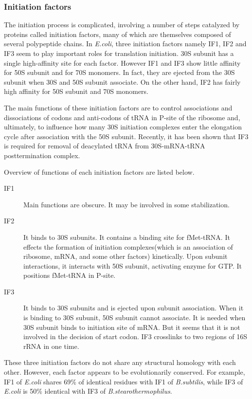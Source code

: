  
\subsubsection{Initiation factors}
The initiation process is complicated, involving a number of steps
catalyzed by proteins called initiation factors, many of which are
themselves composed of several polypeptide chains. In {\it E.coli},
three initiation factors namely IF1, IF2 and IF3 seem to play
important roles for translation initiation. 30S subunit has a single
high-affinity site for each factor.  However IF1 and IF3 show little
affinity for 50S subunit and for 70S monomers.  In fact, they are
ejected from the 30S subunit when 30S and 50S subunit associate. On
the other hand, IF2 has fairly high affinity for 50S subunit and 70S
monomers.

The main functions of these initiation factors are to control associations
and dissociations of codons and anti-codons of tRNA in P-site of the
ribosome and, ultimately, to influence how many 30S initiation 
complexes enter the elongation cycle after association with the 50S subunit.
Recently, it has been shown that IF3 is required for removal of
deacylated tRNA from 30S-mRNA-tRNA posttermination complex\cite{label1189}.

Overview of functions of each initiation factors are listed below.
\begin{description}

\item[IF1] Main functions are obscure. 
It may be involved in some stabilization.

\item[IF2] It binds to 30S subunits. It contains a binding site for fMet-tRNA.
      It effects the formation of initiation complexes(which is an association
of  ribosome, mRNA, and some other factors) kinetically. Upon subunit 
interactions, it interacts with 50S subunit, activating enzyme for GTP.
It positions fMet-tRNA in P-site.

\item[IF3] It binds to 30S subunits and is ejected upon subunit association.
  When it is binding to 30S subunit, 50S subunit cannot associate. It is
  needed when 30S subunit binds to initiation site of mRNA. But it seems that
  it is not involved in the decision of start codon.
  IF3 crosslinks to two regions of 16S rRNA in one time.
\end{description}

These three initiation factors do not share any structural homology
with each other. However, each factor appears to be evolutionarily
conserved. For example, IF1 of {\it E.coli} shares 69\% of identical
residues with IF1 of {\it B.subtilis}, while IF3 of {\it E.coli} is
50\% identical with IF3 of {\it B.stearothermophilus}.

